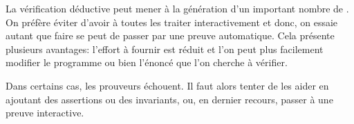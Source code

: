     La vérification déductive peut mener à la génération d'un important nombre de . On préfère éviter d'avoir à toutes les traiter interactivement et donc, on essaie autant que faire se peut de passer par une preuve automatique. Cela présente plusieurs avantages: l'effort à fournir est réduit et l'on peut plus facilement modifier le programme ou bien l'énoncé que l'on cherche à vérifier.

    Dans certains cas, les prouveurs échouent. Il faut alors tenter de les aider en ajoutant des assertions ou des invariants, ou, en dernier recours, passer à une preuve interactive.
